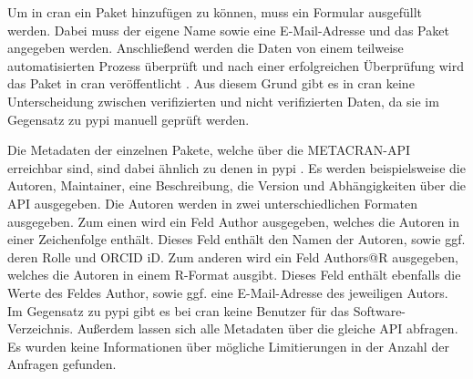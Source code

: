 Um in \gls{cran} ein Paket hinzufügen zu können, muss ein Formular ausgefüllt werden.
Dabei muss der eigene Name sowie eine E-Mail-Adresse und das Paket angegeben werden.
Anschließend werden die Daten von einem teilweise automatisierten Prozess überprüft und nach einer erfolgreichen Überprüfung wird das Paket in \gls{cran} veröffentlicht \autocite{altmann_comprehensive_2024}.
Aus diesem Grund gibt es in \gls{cran} keine Unterscheidung zwischen verifizierten und nicht verifizierten Daten, da sie im Gegensatz zu \gls{pypi} manuell geprüft werden.

Die Metadaten der einzelnen Pakete, welche über die METACRAN-API erreichbar sind, sind dabei ähnlich zu denen in \gls{pypi} \autocite{csardi_pkgsearch_2023}.
Es werden beispielsweise die Autoren, Maintainer, eine Beschreibung, die Version und Abhängigkeiten über die API ausgegeben.
Die Autoren werden in zwei unterschiedlichen Formaten ausgegeben.
Zum einen wird ein Feld \glqq Author\grqq{} ausgegeben, welches die Autoren in einer Zeichenfolge enthält.
Dieses Feld enthält den Namen der Autoren, sowie ggf. deren Rolle und ORCID iD.
Zum anderen wird ein Feld \glqq Authors@R\grqq{} ausgegeben, welches die Autoren in einem R-Format ausgibt.
Dieses Feld enthält ebenfalls die Werte des Feldes \glqq Author\grqq{}, sowie ggf. eine E-Mail-Adresse des jeweiligen Autors. 
Im Gegensatz zu \gls{pypi} gibt es bei \gls{cran} keine Benutzer für das Software-Verzeichnis.
Außerdem lassen sich alle Metadaten über die gleiche API abfragen.
Es wurden keine Informationen über mögliche Limitierungen in der Anzahl der Anfragen gefunden.
